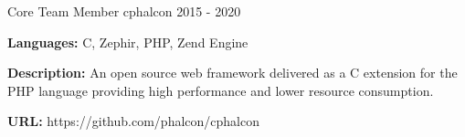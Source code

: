 \begin{cventries}
  \cventry
    {Core Team Member}
    {cphalcon}
    {}
    {2015 - 2020}
    {
      \begin{cvitems}
        \item {\textbf{Languages:} C, Zephir, PHP, Zend Engine}
        \item {\textbf{Description:} An open source web framework delivered as a C extension for the PHP language providing high performance and lower resource consumption.}
        \item {\textbf{URL:} https://github.com/phalcon/cphalcon}
      \end{cvitems}
    }

\end{cventries}
